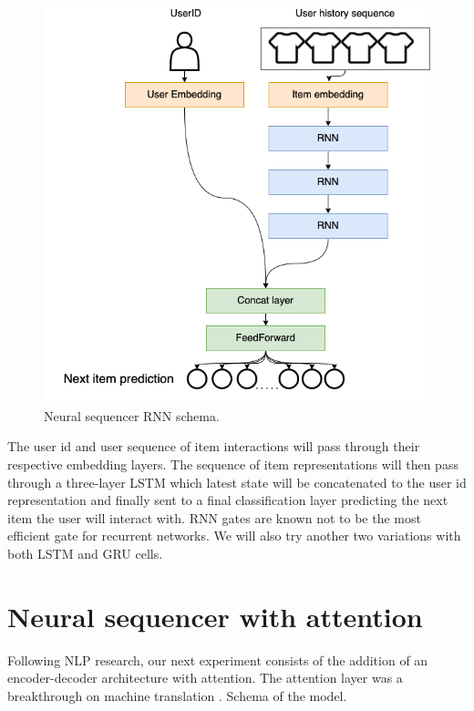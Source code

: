 \documentclass{kththesis}
\begin{document}
\begin{figure}[H]
    \centering
    \includegraphics[scale=0.45]{images/models/RNN.png}
    \caption{Neural sequencer RNN schema.}
\end{figure}

The user id and user sequence of item interactions will pass through their respective embedding layers. The sequence of item representations will then pass through a three-layer LSTM which latest state will be concatenated to the user id representation and finally sent to a final classification layer predicting the next item the user will interact with. RNN gates are known not to be the most efficient gate for recurrent networks. We will also try another two variations with both LSTM and GRU cells.

\section{Neural sequencer with attention}
Following NLP research, our next experiment consists of the addition of an encoder-decoder architecture with attention. The attention layer was a breakthrough on machine translation  \cite{attention}. Schema of the model.
\end{document}
